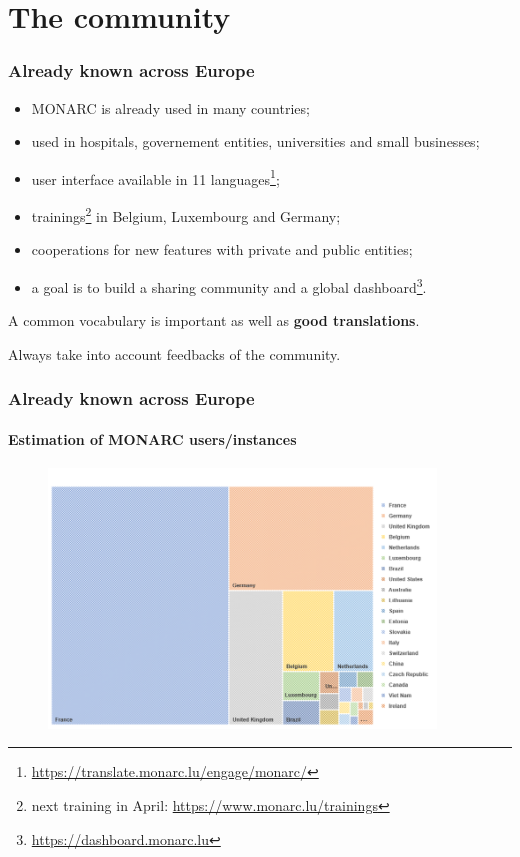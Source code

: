 \documentclass[]{beamer}
\begin{document}
\section{The community}
\begin{frame}
    \frametitle{Already known across Europe}
    \begin{center}
        \begin{itemize}
            \item MONARC is already used in many countries;
            \item used in hospitals, governement entities, universities and small businesses;
            \item user interface available in 11 languages\footnote{\url{https://translate.monarc.lu/engage/monarc/}};
            \item trainings\footnote{next training in April: \url{https://www.monarc.lu/trainings}} in Belgium, Luxembourg and Germany;
            \item cooperations for new features with private and public entities;
            \item a goal is to build a sharing community and a global dashboard\footnote{\url{https://dashboard.monarc.lu}}.
        \end{itemize}
    \end{center}
    \bigskip
    A common vocabulary is important as well as \textbf{good translations}.

    \bigskip
    Always take into account feedbacks of the community.
\end{frame}


\begin{frame}
    \frametitle{Already known across Europe}
    \framesubtitle{Estimation of MONARC users/instances}
    \begin{figure}
        \includegraphics[width=10.3cm]{./pictures/monarc-countries-estimation.png}
      \end{figure}
\end{frame}
\end{document}
